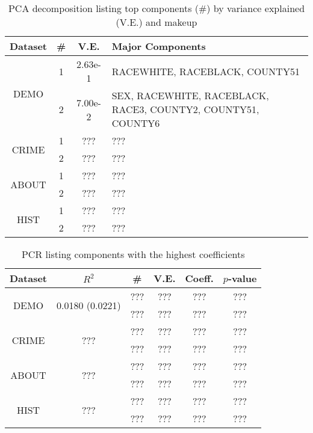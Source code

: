 \documentclass[]{article}
\begin{document}
\begin{table}[h]
  \centering
  \begin{tabular}{|c|c|c|l|}
  \hline
  Dataset & \# & V.E. & Major Components \\
  \hline
  \multirow{2}{*}{DEMO} & 1 & 2.63e-1 & RACEWHITE, RACEBLACK, COUNTY51 \\
  & 2 & 7.00e-2 & SEX, RACEWHITE, RACEBLACK, RACE3, COUNTY2, COUNTY51, COUNTY6 \\
  \hline
  \multirow{2}{*}{CRIME} & 1 & ??? & ??? \\
  & 2 & ??? & ??? \\
  \hline
  \multirow{2}{*}{ABOUT} & 1 & ??? & ??? \\
  & 2 & ??? & ??? \\
  \hline
  \multirow{2}{*}{HIST} & 1 & ??? & ??? \\
  & 2 & ??? & ??? \\
  \hline
  \end{tabular}
  \caption{PCA decomposition listing top components (\#) by variance explained (V.E.) and makeup}
  \label{TablePCR1}
\end{table}

\begin{table}[h]
  \centering
  \begin{tabular}{|c|c|c|c|c|c|}
  \hline
  Dataset & $R^2$ & \# & V.E. & Coeff. & $p$-value \\
  \hline
  \multirow{2}{*}{DEMO} & \multirow{2}{*}{0.0180 (0.0221)} & ??? & ??? & ??? & ??? \\
  && ??? & ??? & ??? & ??? \\
  \hline
  \multirow{2}{*}{CRIME} & \multirow{2}{*}{???} & ??? & ??? & ??? & ??? \\
  && ??? & ??? & ??? & ??? \\  
  \hline
  \multirow{2}{*}{ABOUT} & \multirow{2}{*}{???} & ??? & ??? & ??? & ??? \\
  && ??? & ??? & ??? & ??? \\  
  \hline
  \multirow{2}{*}{HIST} & \multirow{2}{*}{???} & ??? & ??? & ??? & ??? \\
  && ??? & ??? & ??? & ??? \\
  \hline
  \end{tabular}
  \caption{PCR listing components with the highest coefficients}
  \label{TablePCR2}
\end{table}
\end{document}
